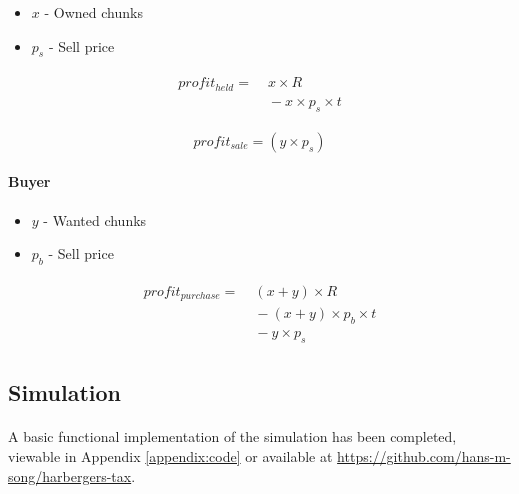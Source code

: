 \begin{itemize}
  \item $x$ - Owned chunks
  \item $p_s$ - Sell price
\end{itemize}


\begin{align}
  \begin{split}
    profit_{held} = &\; x \times R \\
    &\; - x \times p_s \times t
  \end{split}
\end{align}

\begin{equation}
  profit_{sale} = (y \times p_s)
\end{equation}

\paragraph{Buyer}

\begin{itemize}
  \item $y$ - Wanted chunks
  \item $p_b$ - Sell price
\end{itemize}

\begin{align}
  \begin{split}
    profit_{purchase} = &\; (x + y) \times R \\
    &\; - (x + y) \times p_b \times t \\
    &\; - y \times p_s
  \end{split}
\end{align}

\subsection{Simulation}

\paragraph{} A basic functional implementation of the simulation has been completed, viewable in Appendix \ref{appendix:code}  or available at \url{https://github.com/hans-m-song/harbergers-tax}. 

\begin{algorithm}
  \begin{algorithmic}[1]
     
          \EndIf
        \EndFor
      \EndFor
    \EndProcedure
  \end{algorithmic}
\end{algorithm}

